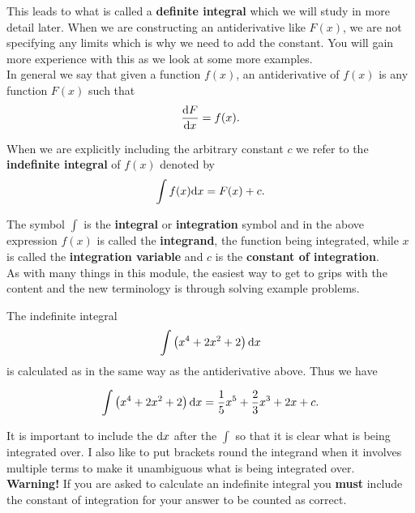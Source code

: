 This leads to what is called a \textbf{definite integral} which we will study in more detail later. When we are constructing an antiderivative like $F(x)$, we are not specifying any limits which is why we need to add the constant. You will gain more experience with this as we look at some more examples.\\

In general we say that given a function $f(x)$, an antiderivative of $f(x)$ is any function $F(x)$ such that 
\begin{equation}
\frac{\mathrm{d} F}{\mathrm{d} x}=f(x).
\label{eq: antiderivative}
\end{equation}

When we are explicitly including the arbitrary constant $c$ we refer to the \textbf{indefinite integral} of $f(x)$ denoted by
\begin{equation}
\int f(x) \mathrm{d} x=F(x)+c.
\label{eq: indefinite integral}
\end{equation}

The symbol $\int$ is the \textbf{integral} or \textbf{integration} symbol and in the above expression $f(x)$ is called the \textbf{integrand}, the function being integrated, while $x$ is called the \textbf{integration variable} and $c$ is the \textbf{constant of integration}.\\

As with many things in this module, the easiest way to get to grips with the content and the new terminology is through solving example problems.
\begin{ex}
The indefinite integral 
\begin{equation*}
\int \left(x^{4}+2x^{2}+2\right)\mathrm{d} x
\end{equation*}
is calculated as in the same way as the antiderivative above. Thus we have 

\begin{equation*}
\int \left(x^{4}+2x^{2}+2\right)\mathrm{d} x=\frac{1}{5}x^{5}+\frac{2}{3}x^{3}+2x+c.
\end{equation*}
\end{ex}

It is important to include the $\mathrm{d} x$ after the $\int$ so that it is clear what is being integrated over. I also like to put brackets round the integrand when it involves multiple terms to make it unambiguous what is being integrated over. \\

\textbf{Warning!} If you are asked to calculate an indefinite integral you \textbf{must} include the constant of integration for your answer to be counted as correct.\\

